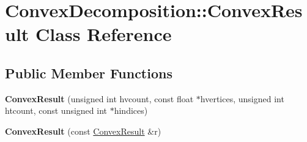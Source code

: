 \hypertarget{class_convex_decomposition_1_1_convex_result}{\section{Convex\-Decomposition\-:\-:Convex\-Result Class Reference}
\label{class_convex_decomposition_1_1_convex_result}
}
\subsection*{Public Member Functions}
\begin{DoxyCompactItemize}
\item 
\hypertarget{class_convex_decomposition_1_1_convex_result_af2d96bc26f1bc45b0ccc21052ed18c67}{{\bfseries Convex\-Result} (unsigned int hvcount, const float $\ast$hvertices, unsigned int htcount, const unsigned int $\ast$hindices)}\label{class_convex_decomposition_1_1_convex_result_af2d96bc26f1bc45b0ccc21052ed18c67}

\item 
\hypertarget{class_convex_decomposition_1_1_convex_result_afc7a0d697c1050875a37986d71cee344}{{\bfseries Convex\-Result} (const \hyperlink{class_convex_decomposition_1_1_convex_result}{Convex\-Result} \&r)}\label{class_convex_decomposition_1_1_convex_result_afc7a0d697c1050875a37986d71cee344}

\end{DoxyCompactItemize}
